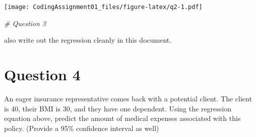 \documentclass[
]{article}
\newenvironment{Shaded}{\begin{snugshade}}{\end{snugshade}}
\newcommand{\CommentTok}[1]{\textcolor[rgb]{0.56,0.35,0.01}{\textit{#1}}}
\begin{document}
\texttt{[image: CodingAssignment01\_files/figure-latex/q2-1.pdf]}

\begin{Shaded}
\begin{Highlighting}[]
\CommentTok{\# Question 3}
\end{Highlighting}
\end{Shaded}

also write out the regression cleanly in this document.

\hypertarget{question-4}{%
\section{Question 4}\label{question-4}}

An eager insurance representative comes back with a potential client.
The client is 40, their BMI is 30, and they have one dependent. Using
the regression equation above, predict the amount of medical expenses
associated with this policy. (Provide a 95\% confidence interval as
well)
\end{document}
